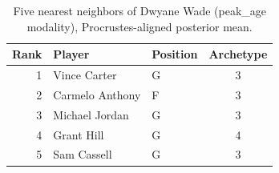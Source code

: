 \begin{table}[htbp]
  \centering\small
  \begin{tabular}{rllc}
    \toprule
    Rank & Player & Position & Archetype \\
    \midrule
    1 & Vince Carter & G & 3 \\
    2 & Carmelo Anthony & F & 3 \\
    3 & Michael Jordan & G & 3 \\
    4 & Grant Hill & G & 4 \\
    5 & Sam Cassell & G & 3 \\
    \bottomrule
  \end{tabular}
  \caption{Five nearest neighbors of Dwyane Wade (peak_age modality), Procrustes-aligned posterior mean.}
  \label{tab:Dwyane_Wade_neighbors_peak_age}
\end{table}

